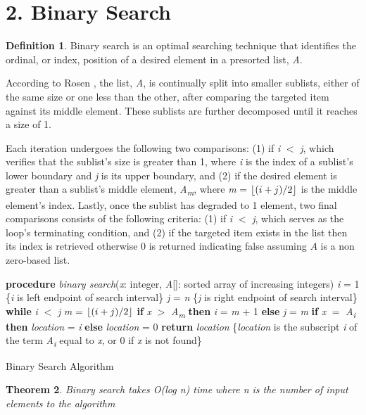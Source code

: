\documentclass[11pt]{article}
\DeclarePairedDelimiter\floor{\lfloor}{\rfloor}
\theoremstyle{plain}
\newtheorem{thm}{Theorem}
\theoremstyle{definition}
\newtheorem{defn}[thm]{Definition}
\begin{document}
\subsection*{}



\section*{2. Binary Search}
\begin{defn}Binary search is an optimal searching technique that identifies the ordinal, or index, position of a desired element in a presorted list, \textit{A}.\end{defn} 

According to Rosen \cite{rosen:1}, the list, \textit{A}, is continually split into smaller sublists, either of the same size or one less than the other, after comparing the targeted item against its middle element. These sublists are further decomposed until it reaches a size of 1. \par Each iteration undergoes the following two comparisons: (1) if \textit{i} $<$ \textit{j}, which verifies that the sublist's size is greater than 1, where \textit{i} is the index of a sublist's lower boundary and \textit{j} is its upper boundary, and (2) if the desired element is greater than a sublist's middle element, \textit{A\textsubscript{m}}, where \textit{m} = $\displaystyle\floor*{(i+j)/2}$ is the middle element's index. Lastly, once the sublist has degraded to 1 element, two final comparisons consists of the following criteria: (1) if \textit{i} $<$ \textit{j}, which serves as the loop's terminating condition, and (2) if the targeted item exists in the list then its index is retrieved otherwise 0 is returned indicating false assuming $\textit{A}$ is a non zero-based list.
\bigbreak
\begin{algorithm}[H]
\SetAlgoLined
 \textbf{procedure} \textit{binary search}(\textit{x}: integer, \textit{A}[]: sorted array of increasing integers)\;
 \textit{i} = 1 \{\textit{i} is left endpoint of search interval\}\;
 \textit{j} = \textit{n} \{\textit{j} is right endpoint of search interval\}\;
 \textbf{while} {\textit{i} $<$ \textit{j}}\;
 \setlength{\parindent}{15pt}\textit{m} = $\displaystyle\floor*{(i+j)/2}$\;
 \textbf{if} \textit{x} $>$ \textit{A\textsubscript{m}} \textbf{then} \textit{i} = \textit{m} + 1\;
 \textbf{else} \textit{j} = \textit{m}\;
 \setlength{\parindent}{0pt}\textbf{if} \textit{x} $=$ \textit{A\textsubscript{i}} \textbf{then} \textit{location} = \textit{i}\;
 \textbf{else} \textit{location} = 0\;
 \textbf{return} \textit{location} \{\textit{location} is the subscript \textit{i} of the term \textit{A\textsubscript{i}} equal to \textit{x}, or 0 if \textit{x} is not found\}
 \caption{Binary Search Algorithm \cite{rosen:1}}
\end{algorithm}
\begin{thm}
Binary search takes O(log n) time where n is the number of input elements to the algorithm
\end{thm}
\end{document}
